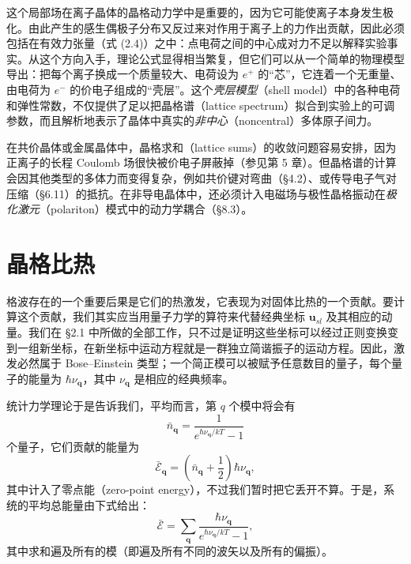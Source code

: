 这个局部场在离子晶体的晶格动力学中是重要的，因为它可能使离子本身发生极化。由此产生的感生偶极子分布又反过来对作用于离子上的力作出贡献，因此必须包括在有效力张量（式 (2.4)）之中：点电荷之间的中心成对力不足以解释实验事实。从这个方向入手，理论公式显得相当繁复，但它们可以从一个简单的物理模型导出：把每个离子换成一个质量较大、电荷设为 $e^+$ 的“芯”，它连着一个无重量、由电荷为 $e^-$ 的价电子组成的“壳层”。这个\emph{壳层模型}（shell model）中的各种电荷和弹性常数，不仅提供了足以把晶格谱（lattice spectrum）拟合到实验上的可调参数，而且解析地表示了晶体中真实的\emph{非中心}（noncentral）多体原子间力。

在共价晶体或金属晶体中，晶格求和（lattice sums）的收敛问题容易安排，因为正离子的长程 Coulomb 场很快被价电子屏蔽掉（参见第 5 章）。但晶格谱的计算会因其他类型的多体力而变得复杂，例如共价键对弯曲（§4.2）、或传导电子气对压缩（§6.11）的抵抗。在非导电晶体中，还必须计入电磁场与极性晶格振动在\emph{极化激元}（polariton）模式中的动力学耦合（§8.3）。

\section{晶格比热}

格波存在的一个重要后果是它们的热激发，它表现为对固体比热的一个贡献。要计算这个贡献，我们其实应当用量子力学的算符来代替经典坐标 $\mathbf{u}_{sl}$ 及其相应的动量。我们在 §2.1 中所做的全部工作，只不过是证明这些坐标可以经过正则变换变到一组新坐标，在新坐标中运动方程就是一群独立简谐振子的运动方程。因此，激发必然属于 Bose–Einstein 类型；一个简正模可以被赋予任意数目的量子，每个量子的能量为 $\hbar\nu_{\mathbf{q}}$，其中 $\nu_{\mathbf{q}}$ 是相应的经典频率。

统计力学理论于是告诉我们，平均而言，第 $q$ 个模中将会有
\begin{equation*}
\bar{n}_{\mathbf{q}} = \frac{1}{e^{\hbar\nu_{\mathbf{q}}/kT}-1}
\tag{2.46}
\end{equation*}
个量子，它们贡献的能量为
\begin{equation*}
\bar{\mathcal{E}}_{\mathbf{q}} = \left(\bar{n}_{\mathbf{q}} + \frac{1}{2}\right)\hbar\nu_{\mathbf{q}},
\tag{2.47}
\end{equation*}
其中计入了零点能（zero-point energy），不过我们暂时把它丢开不算。于是，系统的平均总能量由下式给出：
\begin{equation*}
\bar{\mathcal{E}} = \sum_{\mathbf{q}} \frac{\hbar\nu_{\mathbf{q}}}{e^{\hbar\nu_{\mathbf{q}}/kT}-1},
\tag{2.48}
\end{equation*}
其中求和遍及所有的模（即遍及所有不同的波矢以及所有的偏振）。

